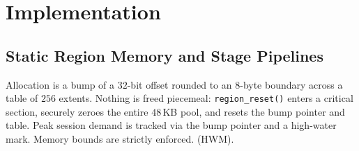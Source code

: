 \documentclass[conference]{IEEEtran}
\begin{document}
\section{Implementation}

\subsection{Static Region Memory and Stage Pipelines}
Allocation is a bump of a $32$-bit offset rounded to an $8$-byte boundary across a table of $256$ extents. Nothing is freed piecemeal: \texttt{region\_reset()} enters a critical section, securely zeroes the entire $48$\,KB pool, and resets the bump pointer and table. Peak session demand is tracked via the bump pointer and a high-water mark. Memory bounds are strictly enforced. (HWM).
\end{document}
